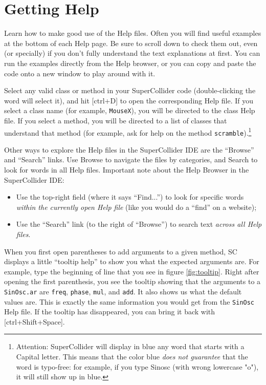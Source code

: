 \section{Getting Help}

Learn how to make good use of the Help files. Often you will find useful examples at the bottom of each Help page. Be sure to scroll down to check them out, even (or specially) if you don't fully understand the text explanations at first. You can run the examples directly from the Help browser, or you can copy and paste the code onto a new window to play around with it. 

Select any valid class or method in your SuperCollider code (double-clicking the word will select it), and hit [ctrl+D] to open the corresponding Help file. If you select a class name (for example, \texttt{MouseX}), you will be directed to the class Help file. If you select a method, you will be directed to a list of classes that understand that method (for example, ask for help on the method \texttt{scramble}).\footnote{Attention: SuperCollider will display in blue any word that starts with a Capital letter. This means that the color blue \emph{does not guarantee} that the word is typo-free: for example, if you type Sinosc (with wrong lowercase "o"), it will still show up in blue.}

Other ways to explore the Help files in the SuperCollider IDE are the ``Browse'' and ``Search'' links. Use Browse to navigate the files by categories, and Search to look for words in all Help files. Important note about the Help Browser in the SuperCollider IDE:
\begin{itemize}
\item Use the top-right field (where it says ``Find...'') to look for specific words \emph{within the currently open Help file} (like you would do a ``find'' on a website);
\item Use the ``Search'' link (to the right of ``Browse'') to search text \emph{across all Help files}.
\end{itemize}

When you first open parentheses to add arguments to a given method, SC displays a little ``tooltip help'' to show you what the expected arguments are. For example, type the beginning of line that you see in figure \ref{fig:tooltip}. Right after opening the first parenthesis, you see the tooltip showing that the arguments to a \texttt{SinOsc.ar} are \texttt{freq}, \texttt{phase}, \texttt{mul}, and \texttt{add}. It also shows us what the default values are. This is exactly the same information you would get from the \texttt{SinOsc} Help file. If the tooltip has disappeared, you can bring it back with [ctrl+Shift+Space].

